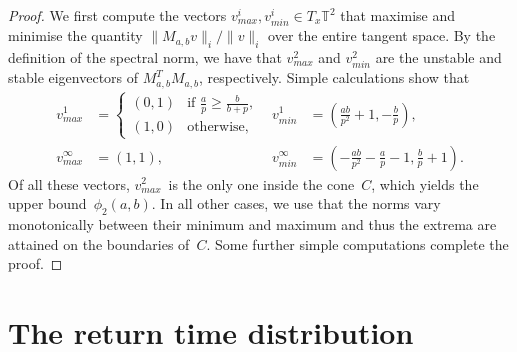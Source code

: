 \documentclass{iopart}
\begin{document}
\begin{proof}
  We first compute the vectors $v_{max}^i, v_{min}^i \in T_x \mathbb{T}^2$ that maximise and minimise the quantity $\|M_{a,b}v\|_i/\|v\|_i$ over the entire tangent space. By the definition of the spectral norm, we have that $v_{max}^2$ and $v_{min}^2$ are the unstable and stable eigenvectors 
of $M_{a,b}^T M_{a,b}$, respectively. Simple calculations show that
  \begin{align*}
    v_{max}^1 &= \begin{cases} (0,1) & \text{if } \frac{a}{p} \ge \frac{b}{b+p} , \\ (1,0) & \text{otherwise}, \end{cases} &
    v_{min}^1 &= \left( \frac{ab}{p^2} +1 , -\frac{b}{p} \right), \\
    v_{max}^\infty &= (1,1), &
    v_{min}^\infty &= \left( -\frac{ab}{p^2} -\frac{a}{p} -1 , \frac{b}{p} +1 \right).
  \end{align*}
  Of all these vectors, $v_{max}^2$~is the only one inside the cone~$C$, which yields the upper bound~$\phi_2(a,b)$. In all other cases, we use that the norms vary monotonically between their minimum and maximum and thus the extrema are attained on the boundaries of~$C$. Some further simple computations complete the proof.
\end{proof}






\section{The return time distribution}
\label{sec:return}
\end{document}
